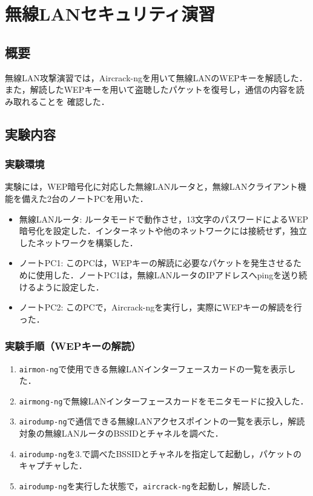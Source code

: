 \chapter{無線LANセキュリティ演習}

\section{概要}

無線LAN攻撃演習では，Aircrack-ngを用いて無線LANのWEPキーを解読した．
また，解読したWEPキーを用いて盗聴したパケットを復号し，通信の内容を読み取れることを
確認した．

\section{実験内容}

\subsection{実験環境}

実験には，WEP暗号化に対応した無線LANルータと，無線LANクライアント機能を備えた2台のノートPCを用いた．

\begin{itemize}
\itemsep1pt\parskip0pt
\item
  無線LANルータ:
  ルータモードで動作させ，13文字のパスワードによるWEP暗号化を設定した．インターネットや他のネットワークには接続せず，独立したネットワークを構築した．
\item
  ノートPC1:
  このPCは，WEPキーの解読に必要なパケットを発生させるために使用した．ノートPC1は，無線LANルータのIPアドレスへpingを送り続けるように設定した．
\item
  ノートPC2:
  このPCで，Aircrack-ngを実行し，実際にWEPキーの解読を行った．
\end{itemize}

\subsection{実験手順（WEPキーの解読）}

\begin{enumerate}
\def\labelenumi{\arabic{enumi}.}
\itemsep1pt\parskip0pt
\item
  \texttt{airmon-ng}で使用できる無線LANインターフェースカードの一覧を表示した．
\item
  \texttt{airmong-ng}で無線LANインターフェースカードをモニタモードに投入した．
\item
  \texttt{airodump-ng}で通信できる無線LANアクセスポイントの一覧を表示し，解読対象の無線LANルータのBSSIDとチャネルを調べた．
\item
  \texttt{airodump-ng}を3.で調べたBSSIDとチャネルを指定して起動し，パケットのキャプチャした．
\item
  \texttt{airodump-ng}を実行した状態で，\texttt{aircrack-ng}を起動し，解読した．
\end{enumerate}

